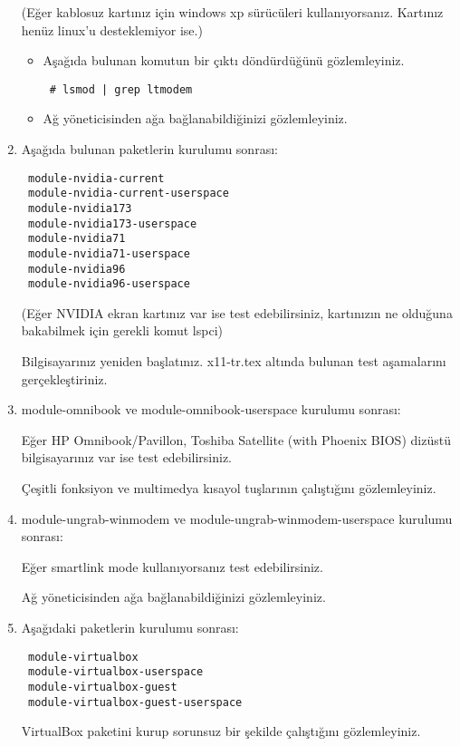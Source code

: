 \documentclass[a4paper,10pt]{article}
\begin{document}
\begin{enumerate}
(Eğer kablosuz kartınız için windows xp sürücüleri kullanıyorsanız. Kartınız henüz linux'u desteklemiyor ise.)

\begin{itemize}
 \item Aşağıda bulunan komutun bir çıktı döndürdüğünü gözlemleyiniz.
 \begin{verbatim}
 # lsmod | grep ltmodem
 \end{verbatim}
\item Ağ yöneticisinden ağa bağlanabildiğinizi gözlemleyiniz.
\end{itemize}

\item Aşağıda bulunan paketlerin kurulumu sonrası:
 \begin{verbatim}
 module-nvidia-current
 module-nvidia-current-userspace
 module-nvidia173
 module-nvidia173-userspace
 module-nvidia71
 module-nvidia71-userspace
 module-nvidia96
 module-nvidia96-userspace
\end{verbatim}
(Eğer NVIDIA ekran kartınız var ise test edebilirsiniz, kartınızın ne olduğuna bakabilmek için gerekli komut lspci)

Bilgisayarınız yeniden başlatınız. x11-tr.tex altında bulunan test aşamalarını gerçekleştiriniz.

\item module-omnibook ve module-omnibook-userspace  kurulumu sonrası: 

Eğer HP Omnibook/Pavillon, Toshiba Satellite (with Phoenix BIOS) dizüstü bilgisayarınız var ise test edebilirsiniz. 

Çeşitli fonksiyon ve multimedya kısayol tuşlarının çalıştığını gözlemleyiniz.

\item module-ungrab-winmodem ve module-ungrab-winmodem-userspace kurulumu sonrası: 

Eğer smartlink mode kullanıyorsanız test edebilirsiniz.

Ağ yöneticisinden ağa bağlanabildiğinizi gözlemleyiniz.

\item  Aşağıdaki paketlerin kurulumu sonrası: 
\begin{verbatim}
 module-virtualbox
 module-virtualbox-userspace
 module-virtualbox-guest
 module-virtualbox-guest-userspace
\end{verbatim}

VirtualBox paketini kurup sorunsuz bir şekilde çalıştığını gözlemleyiniz.

\end{enumerate}
\end{document}
